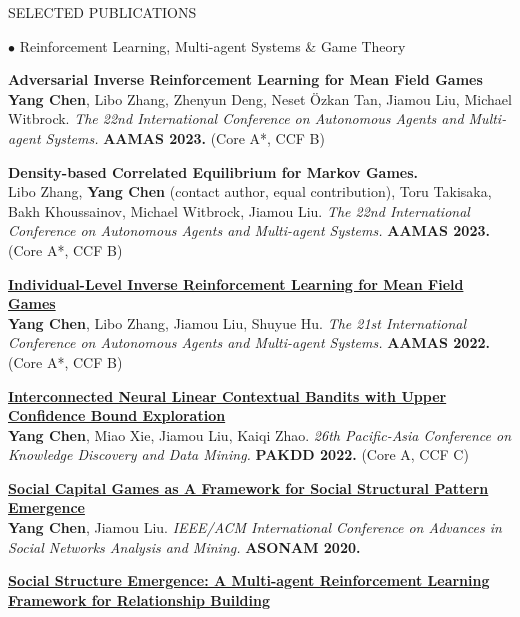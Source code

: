 \documentclass{resume} %
\begin{document}
\begin{rSection}{SELECTED PUBLICATIONS}
\begin{rSubsection}{\large $\bullet$ Reinforcement Learning, Multi-agent Systems \& Game Theory}{}{}{}
	\item {\bf Adversarial Inverse Reinforcement Learning for Mean Field Games}\\
		\textbf{Yang Chen}, Libo Zhang, Zhenyun Deng, Neset \"{O}zkan Tan, Jiamou Liu, Michael Witbrock. {\em The 22nd International Conference on Autonomous Agents and Multi-agent Systems.} \textbf{AAMAS 2023.} (Core A*, CCF B)\\
	\item {\bf Density-based Correlated Equilibrium for Markov Games.}\\
		Libo Zhang, \textbf{Yang Chen} (contact author, equal contribution), Toru Takisaka, Bakh Khoussainov, Michael Witbrock, Jiamou Liu. {\em The 22nd International Conference on Autonomous Agents and Multi-agent Systems.} \textbf{AAMAS 2023.} (Core A*, CCF B)\\
	\item {\href{https://ifaamas.org/Proceedings/aamas2022/pdfs/p253.pdf}{\bf Individual-Level Inverse Reinforcement Learning for Mean Field Games}}\\
		\textbf{Yang Chen}, Libo Zhang, Jiamou Liu, Shuyue Hu. {\em The 21st International Conference on Autonomous Agents and Multi-agent Systems.} \textbf{AAMAS 2022.} (Core A*, CCF B)\\
	\item {\href{}{\bf  Interconnected Neural Linear Contextual Bandits with Upper Confidence Bound Exploration}}\\
		\textbf{Yang Chen}, Miao Xie, Jiamou Liu, Kaiqi Zhao. {\em 26th Pacific-Asia Conference on Knowledge Discovery and Data Mining.} \textbf{PAKDD 2022.} (Core A, CCF C)\\
	\item {\href{http://www.ifaamas.org/Proceedings/aamas2020/pdfs/p1807.pdf}{\bf Social Capital Games as A Framework for Social Structural Pattern Emergence}}\\ 
		\textbf{Yang Chen}, Jiamou Liu. {\em IEEE/ACM International Conference on Advances in Social Networks Analysis and Mining.} \textbf{ASONAM 2020.}\\
	\item {\href{http://www.ifaamas.org/Proceedings/aamas2020/pdfs/p1807.pdf}{\bf Social Structure Emergence: A Multi-agent Reinforcement Learning Framework for Relationship Building}}\\ 

\end{rSubsection}
\end{rSection}
\end{document}
